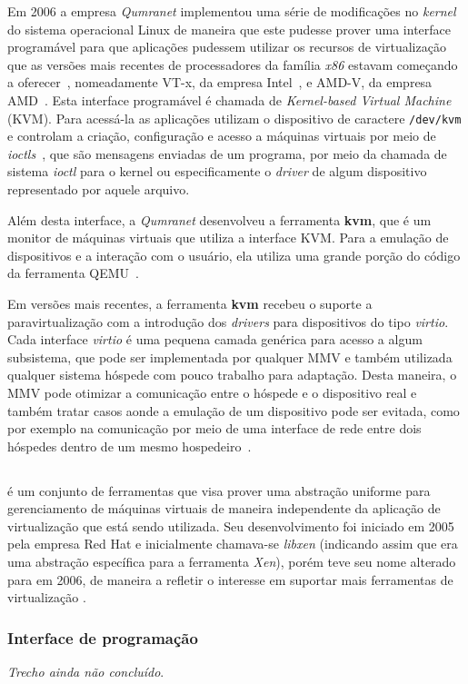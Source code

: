 Em 2006 a empresa \emph{Qumranet} implementou uma série de modificações no
\emph{kernel} do sistema operacional Linux de maneira que este pudesse prover
uma interface programável para que aplicações pudessem utilizar os recursos de
virtualização que as versões mais recentes de processadores da família
\emph{x86} estavam começando a oferecer~\cite{kerneltrap2007avi}, nomeadamente
VT-x, da empresa Intel~\cite{uhlig2005intel}, e AMD-V, da empresa
AMD~\cite{strongin2005trusted}.  Esta interface programável é chamada de
\emph{Kernel-based Virtual Machine} (KVM). Para acessá-la as aplicações
utilizam o dispositivo de caractere \texttt{/dev/kvm} e controlam a criação,
configuração e acesso a máquinas virtuais por meio de
\emph{ioctls}~\cite{kivity2007kvm}, que são mensagens enviadas de um programa,
por meio da chamada de sistema \emph{ioctl} para o kernel ou especificamente o
\emph{driver} de algum dispositivo representado por aquele arquivo.

Além desta interface, a \emph{Qumranet} desenvolveu a ferramenta \textbf{kvm},
que é um monitor de máquinas virtuais que utiliza a interface KVM. Para a
emulação de dispositivos e a interação com o usuário, ela utiliza uma grande
porção do código da ferramenta QEMU~\cite{kerneltrap2007avi}.

Em versões mais recentes, a ferramenta \textbf{kvm} recebeu o suporte a
paravirtualização com a introdução dos \emph{drivers} para dispositivos do tipo
\emph{virtio}. Cada interface \emph{virtio} é uma pequena camada genérica para
acesso a algum subsistema, que pode ser implementada por qualquer MMV e também
utilizada qualquer sistema hóspede com pouco trabalho para adaptação. Desta
maneira, o MMV pode otimizar a comunicação entre o hóspede e o dispositivo real
e também tratar casos aonde a emulação de um dispositivo pode ser evitada, como
por exemplo na comunicação por meio de uma interface de rede entre dois
hóspedes dentro de um mesmo hospedeiro~\cite{russell2008virtio}.


\subsection{\libvirt}\label{sec:libvirt}


\libvirt{} é um conjunto de ferramentas que visa prover uma abstração
uniforme para gerenciamento de máquinas virtuais de maneira independente 
da aplicação de virtualização que está sendo utilizada. Seu desenvolvimento
foi iniciado em 2005 pela empresa Red Hat e inicialmente chamava-se
\emph{libxen} (indicando assim que era uma abstração específica para a
ferramenta \emph{Xen}), porém teve seu nome alterado para \libvirt{} em
2006, de maneira a refletir o interesse em suportar mais ferramentas de
virtualização .

\subsubsection{Interface de programação}\label{sec:libvirtapi}

\emph{Trecho ainda não concluído}.
